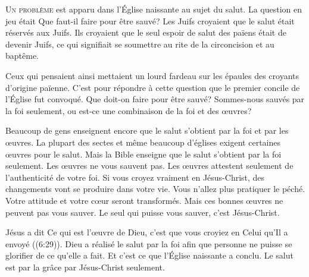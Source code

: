 
\lettrine{U}{n problème} est apparu dans l'Église  naissante
 au sujet du salut. La question en jeu était\frcolon{} 
 \Og Que faut-il faire pour être sauvé? \Fg{}
 Les Juifs croyaient que le salut était réservés aux Juifs.
 Ils croyaient que le seul espoir de salut des païens était de devenir Juifs,
 ce qui signifiait se soumettre au rite de la circoncision et au baptême.

Ceux qui pensaient ainsi mettaient un lourd fardeau sur les épaules
 des croyants d'origine païenne. C'est pour répondre à cette question
 que le premier concile de l'Église fut convoqué. 
 Que doit-on faire pour être sauvé? Sommes-nous sauvés par la foi seulement,
 ou est-ce une combinaison de la foi et des \oe{}uvres?


Beaucoup de gens enseignent encore que le salut s'obtient par la foi
 et par les \oe{}uvres. La plupart des sectes et même beaucoup d'églises
 exigent certaines \oe{}uvres pour le salut.
 Mais la Bible enseigne que le salut s'obtient par la foi seulement.
 Les \oe{}uvres ne vous sauvent pas. Les \oe{}uvres attestent seulement
 de l'authenticité de votre foi. Si vous croyez vraiment en Jésus-Christ,
 des changements vont se produire dans votre vie. Vous n'allez plus pratiquer
 le péché. Votre attitude et votre c\oe{}ur seront transformés.
 Mais ces bonnes \oe{}uvres ne peuvent pas vous sauver.
 Le seul qui puisse vous sauver, c'est Jésus-Christ.

Jésus a dit\frcolon{} 
 \Og Ce qui est l'\oe{}uvre de Dieu, c'est que vous croyiez en Celui
 qu'Il a envoyé \Fg{} ((6:29)).
 Dieu a réalisé le salut par la foi afin que personne ne puisse
 se glorifier de ce qu'elle a fait. Et c'est ce que l'Église 
 naissante a conclu. Le salut est par la grâce \ocadr par Jésus-Christ seulement.

\dvrule


